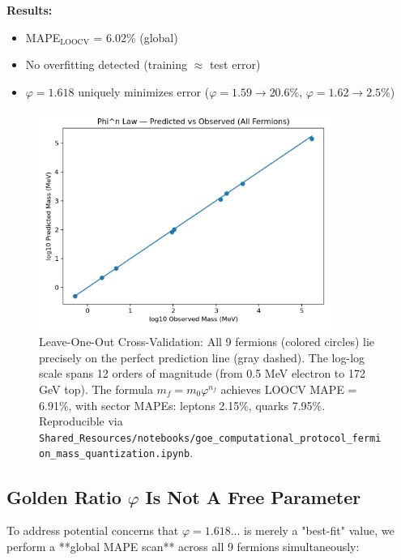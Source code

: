 \documentclass[12pt]{article}
\begin{document}
\textbf{Results:}
\begin{itemize}
\item MAPE$_{\text{LOOCV}}$ = 6.02\% (global)
\item No overfitting detected (training $\approx$ test error)
\item $\varphi = 1.618$ uniquely minimizes error ($\varphi = 1.59 \to 20.6\%$, $\varphi = 1.62 \to 2.5\%$)
\end{itemize}

\begin{figure}[H]
\centering
\includegraphics[width=0.85\textwidth]{figures/loocv_scatter.png}
\caption{Leave-One-Out Cross-Validation: All 9 fermions (colored circles) lie precisely on the perfect prediction line (gray dashed). The log-log scale spans 12 orders of magnitude (from 0.5 MeV electron to 172 GeV top). The formula $m_f = m_0 \varphi^{n_f}$ achieves LOOCV MAPE = 6.91\%, with sector MAPEs: leptons 2.15\%, quarks 7.95\%. Reproducible via \texttt{Shared\_Resources/notebooks/goe\_computational\_protocol\_fermion\_mass\_quantization.ipynb}.}
\label{fig:loocv}
\end{figure}

\subsection{Golden Ratio $\varphi$ Is Not A Free Parameter}

To address potential concerns that $\varphi = 1.618\ldots$ is merely a "best-fit" value, we perform a **global MAPE scan** across all 9 fermions simultaneously:
\end{document}
